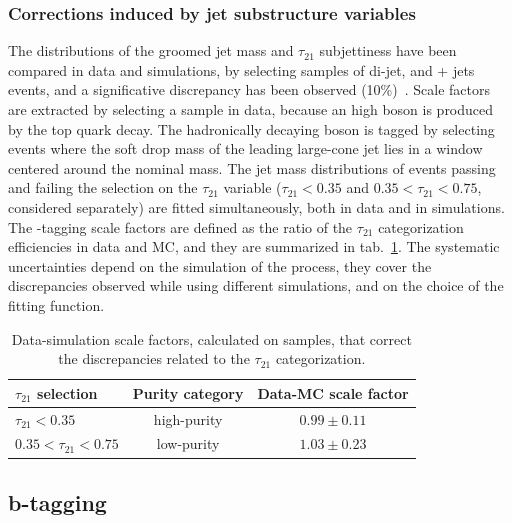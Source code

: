 \subsubsection{Corrections induced by jet substructure variables}
\label{ssec:jetsub_corr}
The distributions of the groomed jet mass and $\tau_{21}$ subjettiness have been compared in data and simulations, by selecting samples of di-jet, \ttbar and \W + jets events, and a significative discrepancy has been observed (10\%)~\cite{Khachatryan:2014vla}. Scale factors are extracted by selecting a \ttbar sample in data, because an high \pt \W boson is produced by the top quark decay. The hadronically decaying \W boson is tagged by selecting events where the soft drop mass of the leading large-cone jet lies in a window centered around the nominal \W mass. The jet mass distributions of events passing and failing the selection on the $\tau_{21}$ variable ($\tau_{21}<0.35$ and $0.35 < \tau_{21} < 0.75$, considered separately) are fitted simultaneously, both in data and in simulations. The \V-tagging scale factors are defined as the ratio of the $\tau_{21}$ categorization efficiencies in data and MC, and they are summarized in tab.~\ref{tab:tau21_sf}. The systematic uncertainties depend on the simulation of the \ttbar process, they cover the discrepancies observed while using different simulations, and on the choice of the fitting function.

\begin{table}[!htb]
  \centering
  \begin{tabular}{l|c|c}
    $\tau_{21}$ selection & Purity category & Data-MC scale factor \\
    \hline
    \hline
    $\tau_{21}<0.35$ & high-purity & $0.99 \pm 0.11$ \\
    $0.35 < \tau_{21} < 0.75$ & low-purity & $1.03 \pm 0.23$ \\
  \end{tabular}
  \caption{Data-simulation scale factors, calculated on \ttbar samples, that correct the discrepancies related to the $\tau_{21}$ categorization.}
  \label{tab:tau21_sf}
\end{table}

\subsection{b-tagging}\label{ssec:btagging}
 
% 

